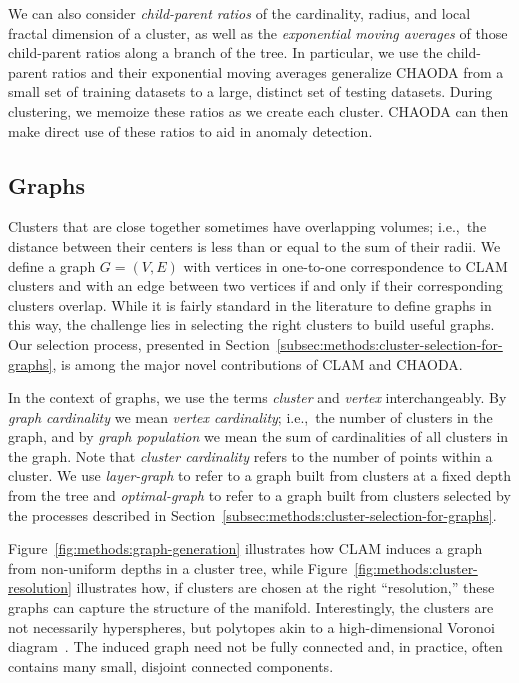 We can also consider \textit{child-parent ratios} of the cardinality, radius, and local fractal dimension of a cluster, as well as the \textit{exponential moving averages} of those child-parent ratios along a branch of the tree.
In particular, we use the child-parent ratios and their exponential moving averages generalize CHAODA from a small set of training datasets to a large, distinct set of testing datasets.
During clustering, we memoize these ratios as we create each cluster.
CHAODA can then make direct use of these ratios to aid in anomaly detection.


\subsection{Graphs}
\label{subsec:methods:graphs}

Clusters that are close together sometimes have overlapping volumes; i.e.,\ the distance between their centers is less than or equal to the sum of their radii.
We define a graph $G=(V,E)$ with vertices in one-to-one correspondence to CLAM clusters and with an edge between two vertices if and only if their corresponding clusters overlap.
While it is fairly standard in the literature to define graphs in this way, the challenge lies in selecting the right clusters to build useful graphs.
Our selection process, presented in Section~\ref{subsec:methods:cluster-selection-for-graphs}, is among the major novel contributions of CLAM and CHAODA.

In the context of graphs, we use the terms \textit{cluster} and \textit{vertex} interchangeably.
By \textit{graph cardinality} we mean \textit{vertex cardinality}; i.e.,\ the number of clusters in the graph, and by \textit{graph population} we mean the sum of cardinalities of all clusters in the graph.
Note that \textit{cluster cardinality} refers to the number of points within a cluster.
We use \textit{layer-graph} to refer to a graph built from clusters at a fixed depth from the tree and \textit{optimal-graph} to refer to a graph built from clusters selected by the processes described in Section~\ref{subsec:methods:cluster-selection-for-graphs}.

Figure~\ref{fig:methods:graph-generation} illustrates how CLAM induces a graph from non-uniform depths in a cluster tree, while Figure~\ref{fig:methods:cluster-resolution} illustrates how, if clusters are chosen at the right ``resolution,'' these graphs can capture the structure of the manifold.
Interestingly, the clusters are not necessarily hyperspheres, but polytopes akin to a high-dimensional Voronoi diagram~\cite{voronoi1908nouvelles}.
The induced graph need not be fully connected and, in practice, often contains many small, disjoint connected components.

